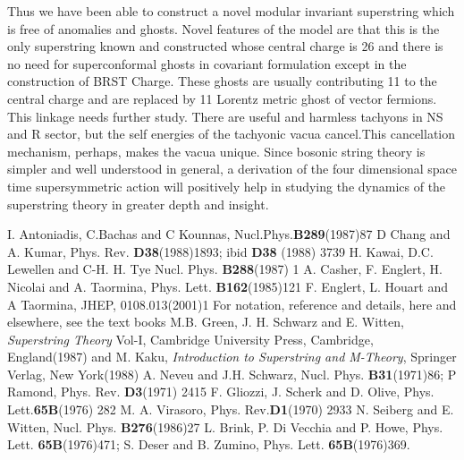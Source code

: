 \documentclass[a4paper,showpacs,preprintnumbers,amsmath,amssymb]{revtex4}
\begin{document}
Thus we have been able to construct a novel modular invariant superstring which 
is free of anomalies and ghosts. Novel features of the model are that this is the only
superstring known and constructed whose central charge is 26 and  there is no need for
superconformal ghosts in covariant formulation except in the construction of BRST Charge.
These ghosts are usually contributing 11 to the central charge and are replaced by 11 
Lorentz metric ghost of vector fermions. This linkage needs further study. There are 
useful and harmless tachyons in NS and R sector, but the self energies of the tachyonic 
vacua cancel.This cancellation mechanism, perhaps, makes the vacua unique.
Since bosonic string theory is simpler and well understood in general, a derivation of the 
four dimensional space time supersymmetric action will positively help in studying the 
dynamics of the superstring theory in greater depth and insight.


\begin{thebibliography}{99}
 I. Antoniadis, C.Bachas and C Kounnas, Nucl.Phys.{\bf B289}(1987)87
 D Chang and A. Kumar, Phys. Rev. {\bf D38}(1988)1893; ibid {\bf D38}
(1988) 3739
 H. Kawai, D.C. Lewellen and C-H. H. Tye Nucl. Phys. {\bf B288}(1987) 1
 A. Casher, F. Englert, H. Nicolai and A. Taormina, 
Phys. Lett. {\bf B162}(1985)121 
 F. Englert, L. Houart and A Taormina, JHEP, 0108.013(2001)1
 For notation, reference and details, here and elsewhere, see the 
text books M.B. Green, J. H. Schwarz and E. Witten,\\ 
{\it Superstring Theory} Vol-I, Cambridge University Press, Cambridge, England(1987) and 
M. Kaku, {\it Introduction to Superstring and M-Theory}, Springer Verlag, New York(1988)
 A. Neveu and J.H. Schwarz, Nucl. Phys. {\bf B31}(1971)86; P Ramond,
Phys. Rev. {\bf D3}(1971) 2415
 F. Gliozzi, J. Scherk and D. Olive, Phys. Lett.{\bf 65B}(1976) 282
 M. A. Virasoro, Phys. Rev.{\bf D1}(1970) 2933
 N. Seiberg and E. Witten, Nucl. Phys. {\bf B276}(1986)27
 L. Brink, P. Di Vecchia and P. Howe, Phys. Lett. {\bf 65B}(1976)471;
S. Deser and B. Zumino, Phys. Lett. {\bf 65B}(1976)369.
\end{thebibliography}
\end{document}
